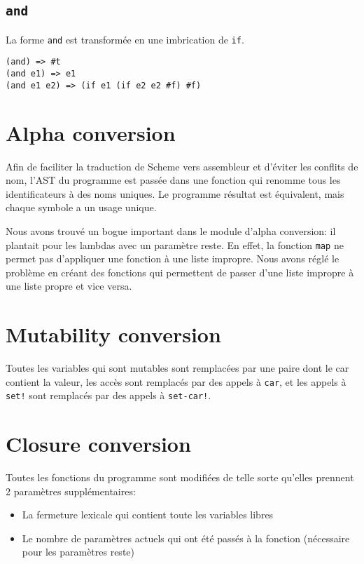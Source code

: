 \documentclass[11pt]{report}
\begin{document}
\subsection{\tt and}

La forme {\tt and} est transformée en une imbrication de {\tt if}.


\begin{verbatim}
(and) => #t
(and e1) => e1
(and e1 e2) => (if e1 (if e2 e2 #f) #f)
\end{verbatim}


\section{Alpha conversion}

Afin de faciliter la traduction de Scheme vers assembleur et d'éviter
les conflits de nom, l'AST du programme est passée dans une fonction
qui renomme tous les identificateurs à des noms uniques.  Le programme
résultat est équivalent, mais chaque symbole a un usage unique.

Nous avons trouvé un bogue important dans le module d'alpha
conversion: il plantait pour les lambdas avec un paramètre reste.  En
effet, la fonction {\tt map} ne permet pas d'appliquer une fonction à
une liste impropre.  Nous avons réglé le problème en créant des
fonctions qui permettent de passer d'une liste impropre à une liste
propre et vice versa.

\section{Mutability conversion}

Toutes les variables qui sont mutables sont remplacées par une paire
dont le car contient la valeur, les accès sont remplacés par des
appels à {\tt car}, et les appels à {\tt set!} sont remplacés par des
appels à {\tt set-car!}.

\section{Closure conversion}

Toutes les fonctions du programme sont modifiées de telle sorte
qu'elles prennent 2 paramètres supplémentaires:

\begin{itemize}
\item La fermeture lexicale qui contient toute les variables libres
\item Le nombre de paramètres actuels qui ont été passés à la fonction
  (nécessaire pour les paramètres reste)
\end{itemize}
\end{document}
